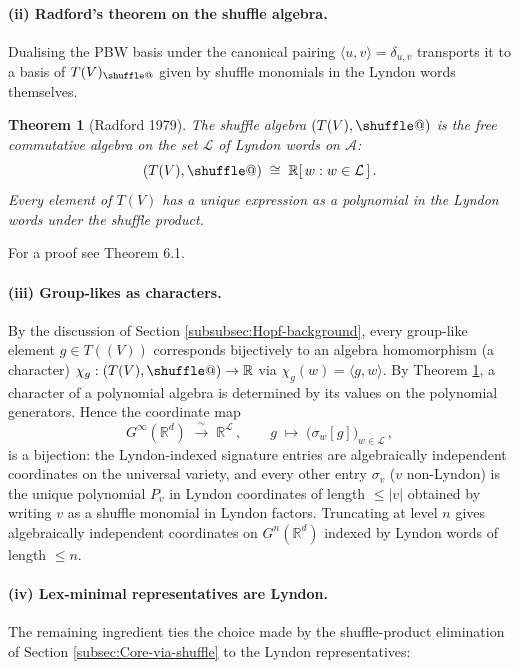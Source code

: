 \documentclass[12pt,english]{article}
\makeatletter
\providecommand*{\shuffle}{\mathbin{\mathpalette\shuffle@{}}}
\newcommand*{\shuffle@}[2]{%
  \sbox0{$#1\vcenter{}$}%
  \kern .15\ht0
  \rlap{\vrule height .25\ht0 depth 0pt width 2.5\ht0}%
  \raise.1\ht0\hbox to 2.5\ht0{%
    \vrule height 1.75\ht0 depth -.1\ht0 width .17\ht0
    \hfill
    \vrule height 1.75\ht0 depth -.1\ht0 width .17\ht0
    \hfill
    \vrule height 1.75\ht0 depth -.1\ht0 width .17\ht0}%
  \kern .15\ht0
}
\newtheorem{theorem}{Theorem}
\theoremstyle{remark}
\makeatother
\begin{document}
\paragraph{(ii) Radford's theorem on the shuffle algebra.}
Dualising the PBW basis under the canonical pairing $\langle u,v\rangle=\delta_{u,v}$
transports it to a basis of $T(V)_{\shuffle}$ given by shuffle monomials
in the Lyndon words themselves.

\begin{theorem}[Radford 1979]
\label{thm:Radford} The shuffle algebra $(T(V),\shuffle)$ is the
free commutative algebra on the set $\mathcal{L}$ of Lyndon words
on $\mathcal{A}$:
\[
(T(V),\shuffle)\;\cong\;\mathbb{R}[\,w:w\in\mathcal{L}\,]\,.
\]
Every element of $T(V)$ has a unique expression as a polynomial in
the Lyndon words under the shuffle product.
\end{theorem}

For a proof see \cite{Reutenauer} Theorem 6.1.

\paragraph{(iii) Group-likes as characters.}
By the discussion of Section \ref{subsubsec:Hopf-background}, every
group-like element $g\in T((V))$ corresponds bijectively to an algebra
homomorphism (a character) $\chi_{g}:(T(V),\shuffle)\to\mathbb{R}$
via $\chi_{g}(w)=\langle g,w\rangle$. By Theorem \ref{thm:Radford},
a character of a polynomial algebra is determined by its values on
the polynomial generators. Hence the coordinate map
\[
G^{\infty}(\mathbb{R}^{d})\;\xrightarrow{\;\sim\;}\;\mathbb{R}^{\mathcal{L}}\,,\qquad g\;\longmapsto\;\bigl(\sigma_{w}[g]\bigr)_{w\in\mathcal{L}}\,,
\]
is a bijection: the Lyndon-indexed signature entries are algebraically
independent coordinates on the universal variety, and every other
entry $\sigma_{v}$ ($v$ non-Lyndon) is the unique polynomial $P_{v}$
in Lyndon coordinates of length $\leq|v|$ obtained by writing $v$
as a shuffle monomial in Lyndon factors. Truncating at level $n$
gives algebraically independent coordinates on $G^{n}(\mathbb{R}^{d})$
indexed by Lyndon words of length $\leq n$.

\paragraph{(iv) Lex-minimal representatives are Lyndon.}
The remaining ingredient ties the choice made by the shuffle-product
elimination of Section \ref{subsec:Core-via-shuffle} to the Lyndon
representatives:
\end{document}
